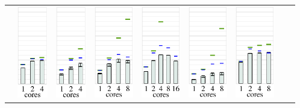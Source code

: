 \begin{tabular}{ccccccccl}
  & 
  \includegraphics[height=4.0cm,clip=true]{images/perf/p-80/p-woody-hsw-n-70-b-1}%
  & 
  \includegraphics[height=4.0cm,clip=true]{images/perf/p-80/p-hasep1-n-70-b-1}%
  & 
  \includegraphics[height=4.0cm,clip=true]{images/perf/p-80/p-meggie-n-70-b-1}%
  & 
  \includegraphics[height=4.0cm,clip=true]{images/perf/p-80/p-skylakesp2-n-70-b-1}%
  & 
  \includegraphics[height=4.0cm,clip=true]{images/perf/p-80/p-knightmare1-n-70-b-1}%
  & 
  \includegraphics[height=4.0cm,clip=true]{images/perf/p-80/p-summitridge1-n-70-b-1}%

\end{tabular}
